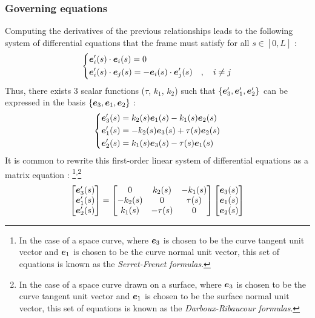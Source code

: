 \subsubsection{Governing equations}
Computing the derivatives of the previous relationships leads to the following system of differential equations that the frame must satisfy for all $s \in [0,L]$ :
\begin{equation}
	\left\{
	\begin{aligned}
		&\boldsymbol{e}'_i(s) \cdot \boldsymbol{e}_i(s) = 0 \\
		&\boldsymbol{e}'_{i}(s) \cdot \boldsymbol{e}_{j}(s) = -\boldsymbol{e}_{i}(s) \cdot \boldsymbol{e}'_{j}(s)\quad , \quad i \neq j
	\end{aligned}
	\right.
\end{equation}
Thus, there exists 3 scalar functions ($\tau$, $k_{1}$, $k_{2}$) such that $\{\boldsymbol{e}'_{3}, \boldsymbol{e}'_{1}, \boldsymbol{e}'_{2}\}$ can be expressed in the basis $\{\boldsymbol{e}_{3}, \boldsymbol{e}_{1}, \boldsymbol{e}_{2}\}$ :
\begin{equation}
	\left\{
	\begin{aligned}
		&\boldsymbol{e}'_{3}(s) = k_{2}(s)\boldsymbol{e}_{1}(s) - k_{1}(s)\boldsymbol{e}_{2}(s) \\
		&\boldsymbol{e}'_{1}(s) = -k_{2}(s)\boldsymbol{e}_{3}(s) + \tau(s)\boldsymbol{e}_{2}(s) \\
		&\boldsymbol{e}'_{2}(s) = k_{1}(s)\boldsymbol{e}_{3}(s) - \tau(s)\boldsymbol{e}_{1}(s)
	\end{aligned}
	\right.
\end{equation}
It is common to rewrite this first-order linear system of differential equations as a matrix equation : \footnote{In the case of a space curve, where $\boldsymbol{e}_3$ is chosen to be the curve tangent unit vector and $\boldsymbol{e}_1$ is chosen to be the curve normal unit vector, this set of equations is known as the \emph{Serret-Frenet formulas}.}\textsuperscript{,}\footnote{In the case of a space curve drawn on a surface, where $\boldsymbol{e}_3$ is chosen to be the curve tangent unit vector and $\boldsymbol{e}_1$ is chosen to be the surface normal unit vector, this set of equations is known as the \emph{Darboux-Ribaucour formulas}.}
\begin{equation}
	\begin{bmatrix}
		\boldsymbol{e}'_{3}(s) \\
		\boldsymbol{e}'_{1}(s) \\
		\boldsymbol{e}'_{2}(s)
	\end{bmatrix}
	=
	\begin{bmatrix}
		0 & k_{2}(s) & -k_{1}(s) \\
		-k_{2}(s) & 0 & \tau(s) \\
		k_{1}(s) & -\tau(s) & 0
	\end{bmatrix}
	\begin{bmatrix}
		\boldsymbol{e}_{3}(s) \\
		\boldsymbol{e}_{1}(s) \\
		\boldsymbol{e}_{2}(s)
	\end{bmatrix}
\label{eq:movingframe}
\end{equation}
